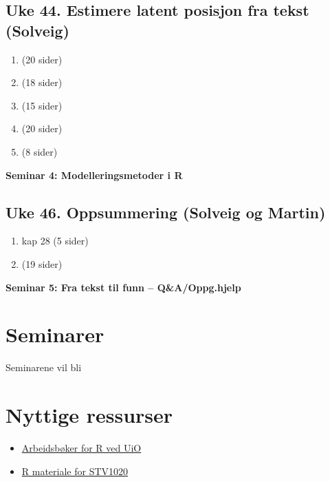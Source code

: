 \documentclass[
]{book}
\providecommand{\tightlist}{%
  \setlength{\itemsep}{0pt}\setlength{\parskip}{0pt}}
\begin{document}
\hypertarget{uke-44.-estimere-latent-posisjon-fra-tekst-solveig}{%
\subsection{Uke 44. Estimere latent posisjon fra tekst (Solveig)}\label{uke-44.-estimere-latent-posisjon-fra-tekst-solveig}}

\begin{enumerate}
\def\labelenumi{\arabic{enumi}.}
\tightlist
\item
  \citet{Laver2003} (20 sider)
\item
  \citet{Slapin2008} (18 sider)
\item
  \citet{Lowe2017} (15 sider)
\item
  \citet{Lauderdale2016} (20 sider)
\item
  \citet{Peterson2018} (8 sider)
\end{enumerate}

\textbf{Seminar 4: Modelleringsmetoder i R}

\hypertarget{uke-46.-oppsummering-solveig-og-martin}{%
\subsection{Uke 46. Oppsummering (Solveig og Martin)}\label{uke-46.-oppsummering-solveig-og-martin}}

\begin{enumerate}
\def\labelenumi{\arabic{enumi}.}
\tightlist
\item
  \citet{Grimmer2022} kap 28 (5 sider)
\item
  \citet{Wilkerson2017} (19 sider)
\end{enumerate}

\textbf{Seminar 5: Fra tekst til funn -- Q\&A/Oppg.hjelp}

\hypertarget{seminarer}{%
\section{Seminarer}\label{seminarer}}

Seminarene vil bli

\hypertarget{nyttige-ressurser}{%
\section{Nyttige ressurser}\label{nyttige-ressurser}}

\begin{itemize}
\tightlist
\item
  \href{https://shinyibv02.uio.no/connect/\#/apps/55/access}{Arbeidsbøker for R ved UiO}
\item
  \href{https://github.com/liserodland/STV1020}{R materiale for STV1020}
\end{itemize}
\end{document}
